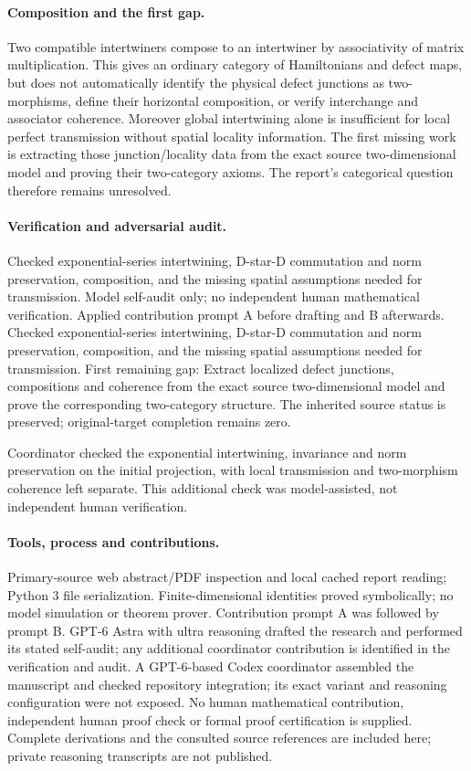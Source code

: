 \documentclass[11pt]{article}
\begin{document}
\paragraph{Composition and the first gap.} Two compatible intertwiners compose to an intertwiner by associativity of matrix multiplication. This gives an ordinary category of Hamiltonians and defect maps, but does not automatically identify the physical defect junctions as two-morphisms, define their horizontal composition, or verify interchange and associator coherence. Moreover global intertwining alone is insufficient for local perfect transmission without spatial locality information. The first missing work is extracting those junction/locality data from the exact source two-dimensional model and proving their two-category axioms. The report's categorical question therefore remains unresolved.

\paragraph{Verification and adversarial audit.}
Checked exponential-series intertwining, D-star-D commutation and norm preservation, composition, and the missing spatial assumptions needed for transmission. Model self-audit only; no independent human mathematical verification. Applied contribution prompt A before drafting and B afterwards. Checked exponential-series intertwining, D-star-D commutation and norm preservation, composition, and the missing spatial assumptions needed for transmission. First remaining gap: Extract localized defect junctions, compositions and coherence from the exact source two-dimensional model and prove the corresponding two-category structure. The inherited source status is preserved; original-target completion remains zero.

Coordinator checked the exponential intertwining, invariance and norm preservation on the initial projection, with local transmission and two-morphism coherence left separate. This additional check was model-assisted, not independent human verification.

\paragraph{Tools, process and contributions.}
Primary-source web abstract/PDF inspection and local cached report reading; Python 3 file serialization. Finite-dimensional identities proved symbolically; no model simulation or theorem prover. Contribution prompt A was followed by prompt B. GPT-6 Astra with ultra reasoning drafted the research and performed its stated self-audit; any additional coordinator contribution is identified in the verification and audit. A GPT-6-based Codex coordinator assembled the manuscript and checked repository integration; its exact variant and reasoning configuration were not exposed. No human mathematical contribution, independent human proof check or formal proof certification is supplied. Complete derivations and the consulted source references are included here; private reasoning transcripts are not published.
\end{document}
